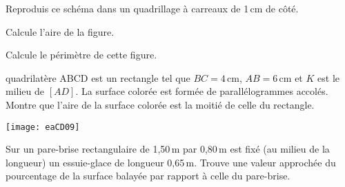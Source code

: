 \begin{exercice}[Le nautile]

\begin{colenumerate}{1} 
\item Reproduis ce schéma dans un quadrillage à carreaux de 1\,cm de côté.
\item Calcule l'aire de la figure.
\item Calcule le périmètre de cette figure.
\end{colenumerate} 
\end{exercice}



\begin{exercice}
\end{exercice}


\begin{exercice}[] 
quadrilatère ABCD est un rectangle tel que $BC = 4$\,cm, $AB = 6$\,cm et $K$ est le milieu de $[AD]$. La surface colorée est formée de parallélogrammes accolés. Montre que l'aire de la surface colorée est la moitié de celle du rectangle.
\begin{center}
    \texttt{[image: eaCD09]}
\end{center}
\end{exercice}

\begin{exercice}
Sur un pare-brise rectangulaire de 1,50\,m par 0,80\,m est fixé (au milieu de la longueur) un essuie-glace de longueur 0,65\,m. Trouve une valeur approchée du pourcentage de la surface balayée par rapport à celle du pare-brise.
\end{exercice}


